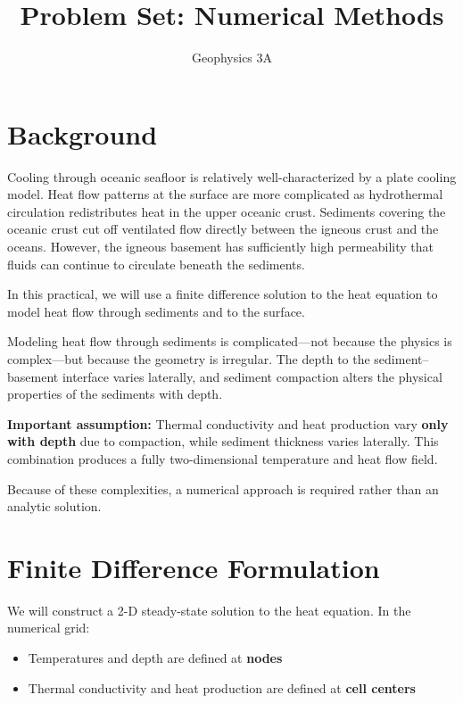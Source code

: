 \documentclass[final,a4paper,12pt]{article}
\title{Problem Set: Numerical Methods}
\author{Geophysics 3A}
\date{}
\begin{document}
\maketitle

\section{Background}

Cooling through oceanic seafloor is relatively well-characterized by a plate
cooling model. Heat flow patterns at the surface are more complicated as
hydrothermal circulation redistributes heat in the upper oceanic crust.
Sediments covering the oceanic crust cut off ventilated flow directly between
the igneous crust and the oceans. However, the igneous basement has sufficiently
high permeability that fluids can continue to circulate beneath the sediments.

In this practical, we will use a finite difference solution to the heat equation
to model heat flow through sediments and to the surface.

Modeling heat flow through sediments is complicated---not because the physics is
complex---but because the geometry is irregular. The depth to the
sediment--basement interface varies laterally, and sediment compaction alters
the physical properties of the sediments with depth.

\textbf{Important assumption:} Thermal conductivity and heat production vary
\textbf{only with depth} due to compaction, while sediment thickness varies
laterally. This combination produces a fully two-dimensional temperature and
heat flow field.


Because of these complexities, a numerical approach is required rather than an
analytic solution.

\bigskip
\section{Finite Difference Formulation}



We will construct a 2-D steady-state solution to the heat equation. In the
numerical grid:

\begin{itemize}
    \item Temperatures and depth are defined at \textbf{nodes}
    \item Thermal conductivity and heat production are defined at
    \textbf{cell centers}
\end{itemize}
\end{document}
